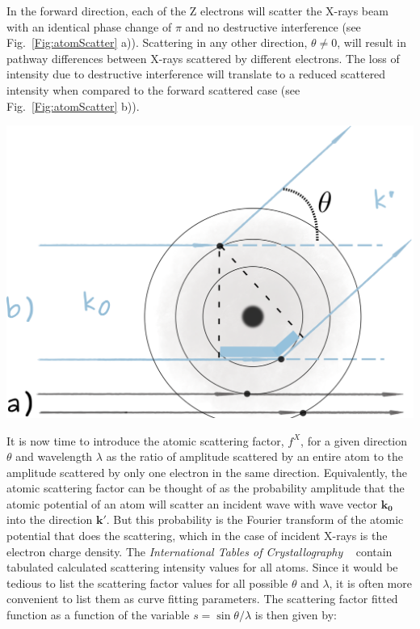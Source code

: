 \noindent \begin{minipage}{0.45\textwidth}
In the forward direction, each of the Z electrons will scatter the X-rays beam with an identical phase change of $\pi$ and no destructive interference (see Fig.~\ref{Fig:atomScatter} a)). Scattering in any other direction, $\theta \neq 0$, will result in pathway differences between X-rays scattered by different electrons. The loss of intensity due to destructive interference will translate to a reduced scattered intensity when compared to the forward scattered case (see Fig.~\ref{Fig:atomScatter} b)).
\end{minipage}
\begin{minipage}{0.55\textwidth}
    \centering
\includegraphics[width=0.7\linewidth]{Figures/atomScatter.png}
\label{Fig:atomScatter}
\end{minipage}

\hspace{0.5cm}

It is now time to introduce the atomic scattering factor, $f^X$, for a given direction $\theta$ and wavelength $\lambda$ as the ratio of amplitude scattered by an entire atom to the amplitude scattered by only one electron in the same direction. Equivalently, the atomic scattering factor can be thought of as the probability amplitude that the atomic potential of an atom will scatter an incident wave with wave vector $\mathbf{k_0}$ into the direction $\mathbf{k'}$. But this probability is the Fourier transform of the atomic potential that does the scattering, which in the case of incident X-rays is the electron charge density. The \textit{International Tables of Crystallography} ~\cite{IntTableCrysBX} contain tabulated calculated scattering intensity values for all atoms. Since it would be tedious to list the scattering factor values for all possible $\theta$ and $\lambda$, it is often more convenient to list them as curve fitting parameters. The scattering factor fitted function as a function of the variable $s = \sin{\theta}/\lambda$ is then given by:

